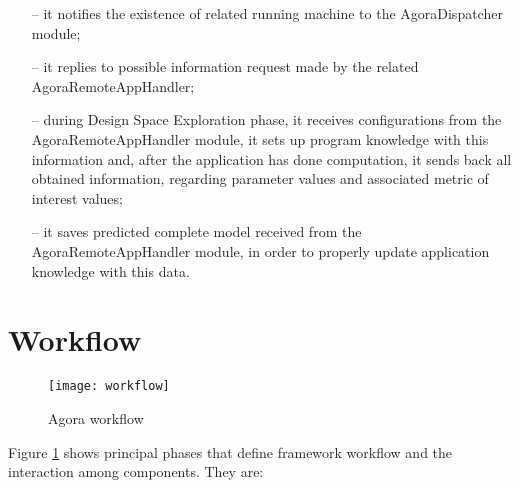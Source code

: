 \begin{enumerate}
\begin{itemize}
		\item [--] it notifies the existence of related running machine to the AgoraDispatcher module;

		\item [--] it replies to possible information request made by the related AgoraRemoteAppHandler;

		\item [--] during Design Space Exploration phase, it receives configurations from the AgoraRemoteAppHandler module, it sets up program knowledge with this information and, after the application has done computation, it sends back all obtained information, regarding parameter values and associated metric of interest values;

		\item [--] it saves predicted complete model received from the AgoraRemoteAppHandler module, in order to properly update application knowledge with this data.
	\end{itemize}

\end{enumerate}



\section{Workflow}

\begin{figure}[htb]

    \centering
    \texttt{[image: workflow]}
    \caption{Agora workflow}
    \label{fig::work}
    
\end{figure}

Figure \ref{fig::work} shows principal phases that define framework workflow and the interaction among components. They are:

